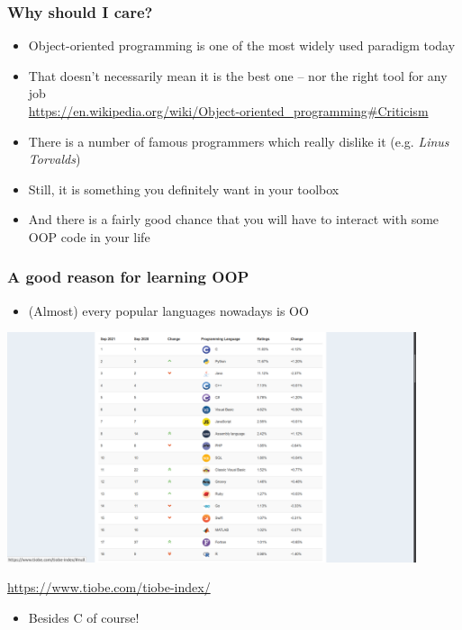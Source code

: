 \documentclass[9pt]{beamer}
\begin{document}
\begin{frame}
  \frametitle{Why should I care?}
  
  \begin{itemize}
    \item Object-oriented programming is one of the most widely used paradigm today
    \smallskip
    \item That doesn't necessarily mean it is the best one -- nor the right tool for any job \\
    \tiny
    \url{https://en.wikipedia.org/wiki/Object-oriented_programming\#Criticism}
    \normalsize
    \smallskip
        
    \item There is a number of famous programmers which really dislike it (e.g. \emph{Linus Torvalds})
    \medskip
    \item Still, it is something you definitely want in your toolbox
    \medskip
    \item And there is a fairly good chance that you will have to interact with some OOP
          code in your life
    \smallskip   
  \end{itemize}

\end{frame}


\begin{frame}
  \frametitle{A good reason for learning OOP}
  
  \begin{itemize}
    \item (Almost) every popular languages nowadays is OO
  \end{itemize}
  
  \smallskip
  
  \centering\includegraphics[width=0.9\textwidth]{tiobe2021.png}
  
  \smallskip
  
  \tiny \url{https://www.tiobe.com/tiobe-index/} \normalsize
  
  \smallskip
  
  \begin{itemize}
    \item Besides C of course!
  \end{itemize}
  
\end{frame}
\end{document}
